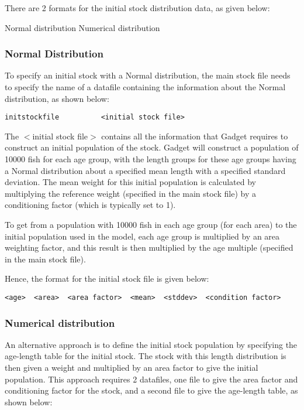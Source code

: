 \documentclass [a4paper, 10pt]{book}
\begin{document}
\bigskip
There are 2 formats for the initial stock distribution data, as given below:\newline

Normal distribution\newline
Numerical distribution

\subsubsection{Normal Distribution}
To specify an initial stock with a Normal distribution, the main stock file needs to specify the name of a datafile containing the information about the Normal distribution, as shown below:

\begin{verbatim}
initstockfile          <initial stock file>
\end{verbatim}

The $<$initial stock file$>$ contains all the information that Gadget requires to construct an initial population of the stock.  Gadget will construct a population of 10000 fish for each age group, with the length groups for these age groups having a Normal distribution about a specified mean length with a specified standard deviation.  The mean weight for this initial population is calculated by multiplying the reference weight (specified in the main stock file) by a conditioning factor (which is typically set to 1).

\bigskip
To get from a population with 10000 fish in each age group (for each area) to the initial population used in the model, each age group is multiplied by an area weighting factor, and this result is then multiplied by the age multiple (specified in the main stock file).

\bigskip
Hence, the format for the initial stock file is given below:

\begin{verbatim}
<age>  <area>  <area factor>  <mean>  <stddev>  <condition factor>
\end{verbatim}

\subsubsection{Numerical distribution}
An alternative approach is to define the initial stock population by specifying the age-length table for the initial stock.  The stock with this length distribution is then given a weight and multiplied by an area factor to give the initial population.  This approach requires 2 datafiles, one file to give the area factor and conditioning factor for the stock, and a second file to give the age-length table, as shown below:
\end{document}
